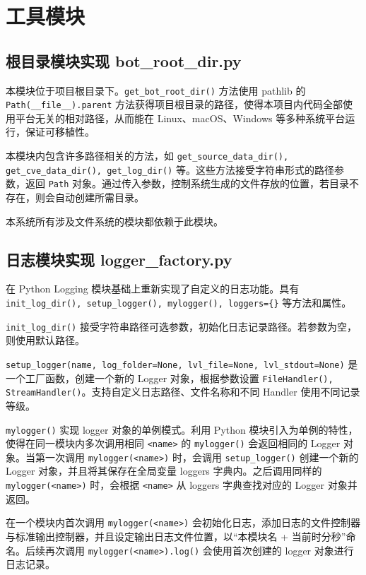\documentclass[a4paper,AutoFakeBold,oneside,12pt]{book}
\begin{document}
\section{工具模块}

\subsection{根目录模块实现 bot{\_}root{\_}dir.py}

本模块位于项目根目录下。\lstinline[style = python]|get_bot_root_dir()| 方法使用 pathlib 的 \lstinline[style = python]|Path(__file__).parent| 方法获得项目根目录的路径，使得本项目内代码全部使用平台无关的相对路径，从而能在 Linux、macOS、Windows 等多种系统平台运行，保证可移植性。

本模块内包含许多路径相关的方法，如 \lstinline|get_source_data_dir(), get_cve_data_dir(), get_log_dir()| 等。这些方法接受字符串形式的路径参数，返回 \lstinline|Path| 对象。通过传入参数，控制系统生成的文件存放的位置，若目录不存在，则会自动创建所需目录。

本系统所有涉及文件系统的模块都依赖于此模块。

\subsection{日志模块实现 logger{\_}factory.py}

在 Python Logging 模块基础上重新实现了自定义的日志功能。具有 \lstinline|init_log_dir(), setup_logger(), mylogger(), loggers={}| 等方法和属性。

\lstinline|init_log_dir()| 接受字符串路径可选参数，初始化日志记录路径。若参数为空，则使用默认路径。

\lstinline|setup_logger(name, log_folder=None, lvl_file=None, lvl_stdout=None)| 是一个工厂函数，创建一个新的 Logger 对象，根据参数设置 \lstinline|FileHandler(), StreamHandler()|。支持自定义日志路径、文件名称和不同 Handler 使用不同记录等级。

\lstinline[style = python]|mylogger()| 实现 logger 对象的单例模式\cite{singleton_design_pattern}。利用 Python 模块引入为单例的特性，使得在同一模块内多次调用相同 \lstinline[style = python]|<name>| 的 \lstinline[style = python]|mylogger()| 会返回相同的 Logger 对象。当第一次调用 \lstinline|mylogger(<name>)| 时，会调用 \lstinline|setup_logger()| 创建一个新的 Logger 对象，并且将其保存在全局变量 loggers 字典内。之后调用同样的 \lstinline|mylogger(<name>)| 时，会根据 \lstinline|<name>| 从 loggers 字典查找对应的 Logger 对象并返回。

在一个模块内首次调用 \lstinline[style = python]|mylogger(<name>)| 会初始化日志，添加日志的文件控制器与标准输出控制器，并且设定输出日志文件位置，以“本模块名 + 当前时分秒”命名。后续再次调用 \lstinline[style = python]|mylogger(<name>).log()| 会使用首次创建的 logger 对象进行日志记录。
\end{document}
